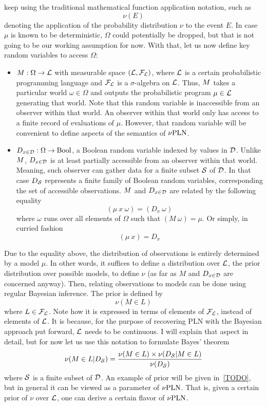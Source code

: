 \documentclass[]{article}
\begin{document}
keep using the traditional mathematical function application notation,
such as
$$\nu(E)$$ denoting the application of the probability distribution
$\nu$ to the event $E$.  In case $\mu$ is known to be deterministic,
$\Omega$ could potentially be dropped, but that is not going to be our
working assumption for now.  With that, let us now define key random
variables to access $\Omega$:
\begin{itemize}
\item $M : \Omega \to \mathcal{L}$ with measurable space
  $(\mathcal{L}, \mathcal{F}_{\mathcal{L}})$, where $\mathcal{L}$ is a certain
  probabilistic programming language and $\mathcal{F}_{\mathcal{L}}$ is a
  $\sigma$-algebra on $\mathcal{L}$.  Thus, $M$ takes a particular
  world $\omega \in \Omega$ and outputs the probabilistic program $\mu
  \in \mathcal{L}$ generating that world.  Note that this random
  variable is inaccessible from an observer within that world.  An
  observer within that world only has access to a finite record of
  evaluations of $\mu$.  However, that random variable will be
  convenient to define aspects of the semantics of $\nu\textup{PLN}$.
\item $D_{x\in\mathcal{D}} : \Omega \to \textup{Bool}$, a Boolean random variable indexed by
  values in $\mathcal{D}$.  Unlike $M$, $D_{x\in\mathcal{D}}$ is at least partially
  accessible from an observer within that world.  Meaning, such
  observer can gather data for a finite subset $\mathcal{S}$ of
  $\mathcal{D}$.  In that case $D_{\mathcal{S}}$ represents a finite family of
  Boolean random variables, corresponding the set of accessible
  observations.  $M$ and $D_{x\in\mathcal{D}}$ are related by the following
  equality
  $$(\mu\ x\ \omega) = (D_x\ \omega)$$ where $\omega$ runs over all
  elements of $\Omega$ such that $(M\ \omega) = \mu$.  Or simply, in
  curried fashion
  $$(\mu\ x) = D_x$$
\end{itemize}
Due to the equality above, the distribution of observations is
entirely determined by a model $\mu$.  In other words, it suffices to
define a distribution over $\mathcal{L}$, the prior distribution over
possible models, to define $\nu$ (as far as $M$ and $D_{x\in\mathcal{D}}$ are
concerned anyway).  Then, relating observations to models can be done
using regular Bayesian inference.  The prior is defined by
$$\nu(M \in L)$$ where $L \in \mathcal{F}_{\mathcal{L}}$.  Note how it is
expressed in terms of elements of $\mathcal{F}_{\mathcal{L}}$, instead of
elements of $\mathcal{L}$.  It is because, for the purpose of recovering
PLN with the Bayesian approach put forward, $\mathcal{L}$ needs to be
continuous.  I will explain that aspect in detail, but for now let us
use this notation to formulate Bayes' theorem
$$\nu(M \in L | D_{\mathcal{S}}) = \frac{\nu(M \in L) \times \nu(D_{\mathcal{S}} | M \in
  L)}{\nu(D_{\mathcal{S}})}$$ where $\mathcal{S}$ is a finite subset of
$\mathcal{D}$.  An example of prior will be given in~\ref{TODO}, but in
general it can be viewed as a parameter of $\nu\textup{PLN}$.  That is, given a
certain prior of $\nu$ over $\mathcal{L}$, one can derive a certain
flavor of $\nu\textup{PLN}$.
\end{document}
